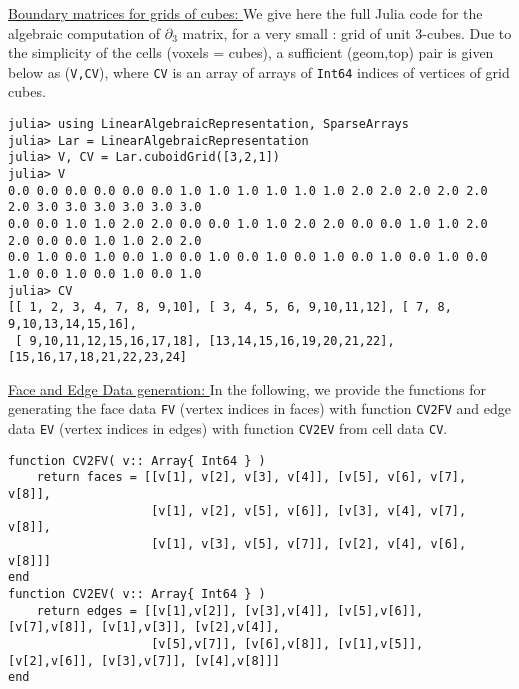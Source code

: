 \vspace{10pt}
\noindent\underline{
Boundary matrices for grids of cubes:
}\vspace{0.2em}\newline 
We give here the full Julia code for the algebraic computation of $\partial_3$ matrix, for a very small :
grid of unit
3-cubes. Due to the simplicity of the cells (voxels = cubes), a sufficient (geom,top) pair is given below
as (\texttt{V,CV}), where \texttt{CV} is an array of arrays of \texttt{Int64} indices of vertices of grid cubes.

\begin{Verbatim}[fontsize=\footnotesize]
julia> using LinearAlgebraicRepresentation, SparseArrays
julia> Lar = LinearAlgebraicRepresentation
julia> V, CV = Lar.cuboidGrid([3,2,1])
julia> V
0.0 0.0 0.0 0.0 0.0 0.0 1.0 1.0 1.0 1.0 1.0 1.0 2.0 2.0 2.0 2.0 2.0 2.0 3.0 3.0 3.0 3.0 3.0 3.0
0.0 0.0 1.0 1.0 2.0 2.0 0.0 0.0 1.0 1.0 2.0 2.0 0.0 0.0 1.0 1.0 2.0 2.0 0.0 0.0 1.0 1.0 2.0 2.0
0.0 1.0 0.0 1.0 0.0 1.0 0.0 1.0 0.0 1.0 0.0 1.0 0.0 1.0 0.0 1.0 0.0 1.0 0.0 1.0 0.0 1.0 0.0 1.0
julia> CV
[[ 1, 2, 3, 4, 7, 8, 9,10], [ 3, 4, 5, 6, 9,10,11,12], [ 7, 8, 9,10,13,14,15,16],
 [ 9,10,11,12,15,16,17,18], [13,14,15,16,19,20,21,22], [15,16,17,18,21,22,23,24]
\end{Verbatim}

\vspace{10pt}
\noindent\underline{
Face and Edge Data generation:
}\vspace{0.2em}\newline 
In the following, we provide the functions for generating the face data \texttt{FV} (vertex indices in faces) with function  \texttt{CV2FV} and edge data \texttt{EV} (vertex indices in edges) with function \texttt{CV2EV} from cell data \texttt{CV}. 



\begin{Verbatim}[fontsize=\footnotesize]
function CV2FV( v:: Array{ Int64 } )
    return faces = [[v[1], v[2], v[3], v[4]], [v[5], v[6], v[7], v[8]],
                    [v[1], v[2], v[5], v[6]], [v[3], v[4], v[7], v[8]],
                    [v[1], v[3], v[5], v[7]], [v[2], v[4], v[6], v[8]]]
end
function CV2EV( v:: Array{ Int64 } )
    return edges = [[v[1],v[2]], [v[3],v[4]], [v[5],v[6]], [v[7],v[8]], [v[1],v[3]], [v[2],v[4]],
                    [v[5],v[7]], [v[6],v[8]], [v[1],v[5]], [v[2],v[6]], [v[3],v[7]], [v[4],v[8]]]
end
\end{Verbatim}

